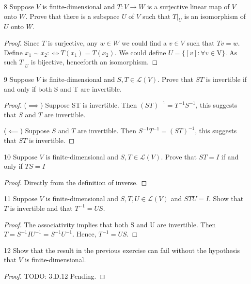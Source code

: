 \documentclass{article}
\newenvironment{problem}[1]{\begin{prob*}{#1}{}}{\end{prob*}}
\begin{document}
\newpage

\begin{problem}{8}
Suppose $V$ is finite-dimensional and $T: V \to W$ is a surjective linear map of $V$ onto $W$. Prove that there is a subspace $U $ of $V $ such that $T|_U$ is an isomorphism of $U$ onto $W$.
\end{problem}
\begin{proof}
	Since $T$ is surjective, any $w \in W$ we could find a $v \in V$ such that $Tv = w$. Define $x_1 \sim  x_2 :\iff T(x_1) = T(x_2)$. We could define $U = \{[v]: \forall v \in $V$\}$. As such $T|_U$ is bijective, henceforth an isomorphism.
\end{proof}

\begin{problem}{9}
Suppose $V$ is finite-dimensional and $S,T \in \mathcal{L}(V).$ Prove that $ST $ is invertible if and only if both S and T are invertible.
\end{problem}
\begin{proof}
	($\implies$) Suppose ST is invertible. Then $(ST)^{-1} = T^{-1}S^{-1}$, this suggests that $S$ and $T$ are invertible.

	($\impliedby$) Suppose $S$ and $T$ are invertible. Then $S^{-1}T^{-1} = (ST)^{-1}$, this suggests that $ST$ is invertible.
\end{proof}

\begin{problem}{10}
Suppose $V$ is finite-dimensional and $S,T \in \mathcal{L}(V)$. Prove that $ST = I$ if and only if $TS = I$
\end{problem}
\begin{proof}
	Directly from the definition of inverse.
\end{proof}

\begin{problem}{11}
Suppose $V$ is finite-dimensional and $S,T,U \in \mathcal{L}(V)$ and $STU = I.$ Show that $T $ is invertible and that $T^{-1} = US$.
\end{problem}
\begin{proof}
	The associativity implies that both S and U are invertible. Then $T = S^{-1}I U^{-1} = S^{-1} U^{-1}$. Hence, $T^{-1} = US$.
\end{proof}

\begin{problem}{12}
Show that the result in the previous exercise can fail without the hypothesis that $V$ is finite-dimensional.
\end{problem}
\begin{proof}
TODO: 3.D.12 Pending.
\end{proof}
\end{document}
